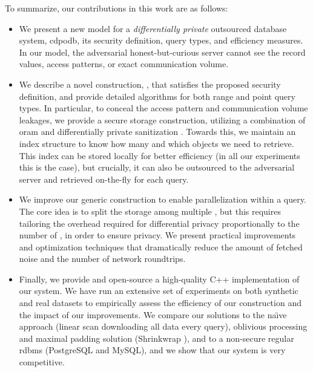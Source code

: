 	To summarize, our contributions in this work are as follows:
	\begin{itemize}
		\item
			We present a new model for a \emph{differentially private} outsourced database system, \acrshort{cdpodb}, its security definition, query types, and efficiency measures.
			In our model, the adversarial honest-but-curious server cannot see the record values, access patterns, or exact communication volume.

		\item
			We describe a novel construction, \epsolute{}, that satisfies the proposed security definition, and provide detailed algorithms for both range and point query types.
			In particular, to conceal the access pattern and communication volume leakages, we provide a secure storage construction, utilizing a combination of \acrlong{oram} \cite{oram-theory, oram-original} and differentially private sanitization \cite{non-interactive-database-privacy}.
			Towards this, we maintain an index structure to know how many and which objects we need to retrieve.
			This index can be stored locally for better efficiency (in all our experiments this is the case), but crucially, it can also be outsourced to the adversarial server and retrieved on-the-fly for each query.

		\item
			We improve our generic construction to enable parallelization within a query.
			The core idea is to split the storage among multiple , but this requires tailoring the overhead required for differential privacy proportionally to the number of , in order to ensure privacy.
			We present practical improvements and optimization techniques that dramatically reduce the amount of fetched noise and the number of network roundtrips.

		\item
			Finally, we provide and open-source a high-quality C++ implementation of our system.
			We have run an extensive set of experiments on both synthetic and real datasets to empirically assess the efficiency of our construction and the impact of our improvements.
			We compare our solutions to the na\"{\i}ve approach (linear scan downloading all data every query), oblivious processing and maximal padding solution (Shrinkwrap \cite{shrinkwrap}), and to a non-secure regular \acrshort{rdbms} (PostgreSQL and MySQL), and we show that our system is very competitive.
	\end{itemize}
